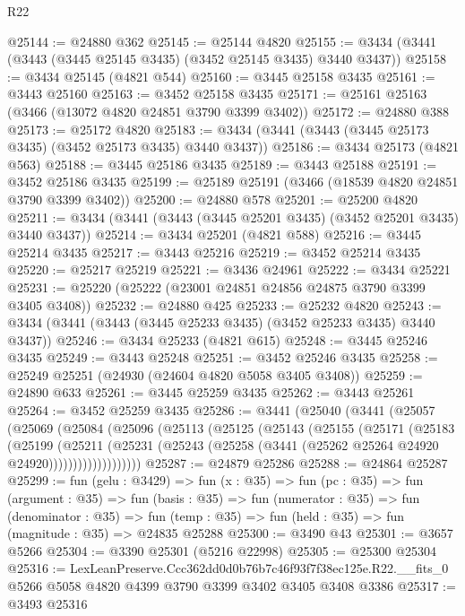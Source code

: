\begin{lexlean}{R22}
\begin{coremodule}
@25144 := @24880 @362
@25145 := @25144 @4820
@25155 := @3434 (@3441 (@3443 (@3445 @25145 @3435) (@3452 @25145 @3435) @3440 @3437))
@25158 := @3434 @25145 (@4821 @544)
@25160 := @3445 @25158 @3435
@25161 := @3443 @25160
@25163 := @3452 @25158 @3435
@25171 := @25161 @25163 (@3466 (@13072 @4820 @24851 @3790 @3399 @3402))
@25172 := @24880 @388
@25173 := @25172 @4820
@25183 := @3434 (@3441 (@3443 (@3445 @25173 @3435) (@3452 @25173 @3435) @3440 @3437))
@25186 := @3434 @25173 (@4821 @563)
@25188 := @3445 @25186 @3435
@25189 := @3443 @25188
@25191 := @3452 @25186 @3435
@25199 := @25189 @25191 (@3466 (@18539 @4820 @24851 @3790 @3399 @3402))
@25200 := @24880 @578
@25201 := @25200 @4820
@25211 := @3434 (@3441 (@3443 (@3445 @25201 @3435) (@3452 @25201 @3435) @3440 @3437))
@25214 := @3434 @25201 (@4821 @588)
@25216 := @3445 @25214 @3435
@25217 := @3443 @25216
@25219 := @3452 @25214 @3435
@25220 := @25217 @25219
@25221 := @3436 @24961
@25222 := @3434 @25221
@25231 := @25220 (@25222 (@23001 @24851 @24856 @24875 @3790 @3399 @3405 @3408))
@25232 := @24880 @425
@25233 := @25232 @4820
@25243 := @3434 (@3441 (@3443 (@3445 @25233 @3435) (@3452 @25233 @3435) @3440 @3437))
@25246 := @3434 @25233 (@4821 @615)
@25248 := @3445 @25246 @3435
@25249 := @3443 @25248
@25251 := @3452 @25246 @3435
@25258 := @25249 @25251 (@24930 (@24604 @4820 @5058 @3405 @3408))
@25259 := @24890 @633
@25261 := @3445 @25259 @3435
@25262 := @3443 @25261
@25264 := @3452 @25259 @3435
@25286 := @3441
    (@25040
      (@3441
        (@25057
          (@25069
            (@25084
              (@25096
                (@25113
                  (@25125
                    (@25143
                      (@25155
                        (@25171
                          (@25183
                            (@25199
                              (@25211
                                (@25231
                                  (@25243
                                    (@25258 (@3441 (@25262 @25264 @24920 @24920)))))))))))))))))))
@25287 := @24879 @25286
@25288 := @24864 @25287
@25299 := fun (gelu : @3429) =>
  fun (x : @35) =>
  fun (pc : @35) =>
  fun (argument : @35) =>
  fun (basis : @35) =>
  fun (numerator : @35) =>
  fun (denominator : @35) =>
  fun (temp : @35) => fun (held : @35) => fun (magnitude : @35) => @24835 @25288
@25300 := @3490 @43
@25301 := @3657 @5266
@25304 := @3390 @25301 (@5216 @22998)
@25305 := @25300 @25304
@25316 := LexLeanPreserve.Ccc362dd0d0b76b7c46f93f7f38ec125e.R22.__fits_0
    @5266
    @5058
    @4820
    @4399
    @3790
    @3399
    @3402
    @3405
    @3408
    @3386
@25317 := @3493 @25316

\end{coremodule}
\end{lexlean}

